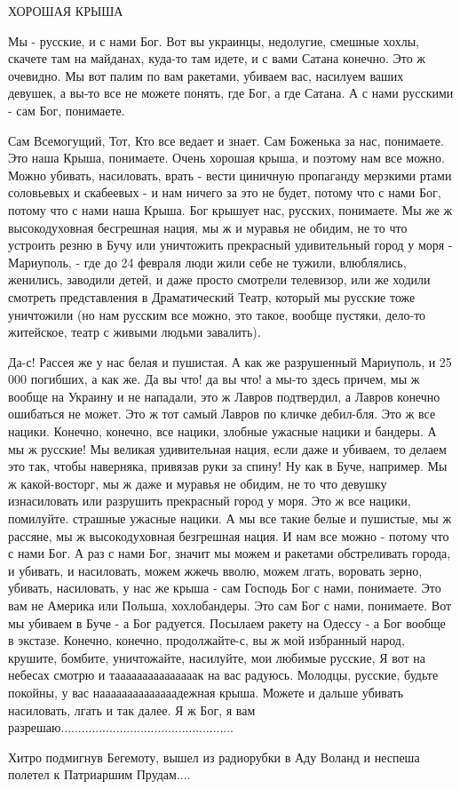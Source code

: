  
 
 
 
 

ХОРОШАЯ КРЫША

Мы - русские, и с нами Бог. Вот вы украинцы, недолугие, смешные хохлы, скачете
там на майданах, куда-то там идете, и с вами Сатана конечно. Это ж очевидно. Мы
вот палим по вам ракетами, убиваем вас, насилуем ваших девушек, а вы-то все не
можете понять, где Бог, а где Сатана.  А с нами русскими - сам Бог, понимаете.

Сам Всемогущий, Тот, Кто все ведает и знает. Сам Боженька за нас, понимаете.
Это наша Крыша, понимаете.  Очень хорошая крыша, и поэтому нам все можно. Можно
убивать, насиловать, врать - вести циничную пропаганду мерзкими ртами
соловьевых и скабеевых - и нам ничего за это не будет, потому что с нами Бог,
потому что с нами наша Крыша. Бог крышует нас, русских, понимаете. Мы же ж
высокодуховная бесгрешная нация, мы ж и муравья не обидим, не то что устроить
резню в Бучу или уничтожить прекрасный удивительный город у моря - Мариуполь, -
где до 24 февраля люди жили себе не тужили, влюблялись, женились, заводили
детей, и даже просто смотрели телевизор, или же ходили смотреть представления в
Драматический Театр, который мы русские тоже уничтожили (но нам русским все
можно, это такое, вообще пустяки, дело-то житейское, театр с живыми людьми завалить).

Да-с! Рассея же у нас белая и пушистая. А как же разрушенный Мариуполь, и 25
000 погибших, а как же. Да вы что! да вы что! а мы-то здесь причем, мы ж вообще
на Украину и не нападали, это ж Лавров подтвердил, а Лавров конечно ошибаться
не может. Это ж тот самый Лавров по кличке дебил-бля.  Это ж все нацики.
Конечно, конечно, все нацики, злобные ужасные нацики и бандеры. А мы ж русские!
Мы великая удивительная нация, если даже и убиваем, то делаем это так, чтобы
наверняка, привязав руки за спину!  Ну как в Буче, например.  Мы ж
какой-восторг, мы ж даже и муравья не обидим, не то что девушку изнасиловать
или разрушить прекрасный город у моря. Это ж все нацики, помилуйте. страшные
ужасные нацики. А мы все такие белые и пушистые, мы ж рассяне, мы ж
высокодуховная безгрешная нация. И нам все можно - потому что с нами Бог. А раз
с нами Бог, значит мы можем и ракетами обстреливать города, и убивать, и
насиловать, можем жжечь вволю, можем лгать, воровать зерно, убивать,
насиловать, у нас же крыша - сам Господь Бог с нами, понимаете. Это вам не
Америка или Польша, хохлобандеры. Это сам Бог с нами, понимаете. Вот мы убиваем
в Буче - а Бог радуется. Посылаем ракету на Одессу - а Бог вообще в экстазе.
Конечно, конечно, продолжайте-с, вы ж мой избранный народ, крушите, бомбите,
уничтожайте, насилуйте, мои любимые русские, Я вот на небесах смотрю и
тааааааааааааааак на вас радуюсь. Молодцы, русские, будьте покойны, у вас
наааааааааааааадежная крыша. Можете и дальше убивать насиловать, лгать и так
далее. Я ж Бог, я вам
разрешаю.................................................. 

Хитро подмигнув Бегемоту, вышел из радиорубки в Аду Воланд и неспеша полетел к Патриаршим
Прудам....
